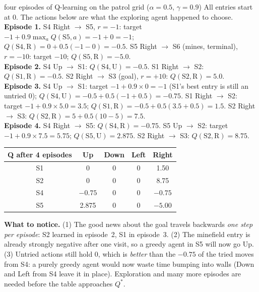 \documentclass[11pt]{article}
\begin{document}
\begin{example}{four episodes of Q-learning on the patrol grid ($\alpha=0.5$, $\gamma=0.9$)}
All entries start at 0. The actions below are what the exploring agent happened to choose.\\[2pt]
\textbf{Episode 1.} S4 Right $\to$ S5, $r=-1$: target $-1+0.9\max_aQ(\text{S5},a)=-1+0=-1$; $Q(\text{S4},\text{R})=0+0.5(-1-0)=-0.5$. S5 Right $\to$ S6 (mines, terminal), $r=-10$: target $-10$; $Q(\text{S5},\text{R})=-5.0$.\\
\textbf{Episode 2.} S4 Up $\to$ S1: $Q(\text{S4},\text{U})=-0.5$. S1 Right $\to$ S2: $Q(\text{S1},\text{R})=-0.5$. S2 Right $\to$ S3 (goal), $r=+10$: $Q(\text{S2},\text{R})=5.0$.\\
\textbf{Episode 3.} S4 Up $\to$ S1: target $-1+0.9\times0=-1$ (S1's best entry is still an untried 0); $Q(\text{S4},\text{U})=-0.5+0.5(-1+0.5)=-0.75$. S1 Right $\to$ S2: target $-1+0.9\times5.0=3.5$; $Q(\text{S1},\text{R})=-0.5+0.5(3.5+0.5)=\mathbf{1.5}$. S2 Right $\to$ S3: $Q(\text{S2},\text{R})=5+0.5(10-5)=7.5$.\\
\textbf{Episode 4.} S4 Right $\to$ S5: $Q(\text{S4},\text{R})=-0.75$. S5 Up $\to$ S2: target $-1+0.9\times7.5=5.75$; $Q(\text{S5},\text{U})=2.875$. S2 Right $\to$ S3: $Q(\text{S2},\text{R})=8.75$.
\begin{center}\small\renewcommand{\arraystretch}{1.2}\begin{tabular}{c|cccc}\toprule Q after 4 episodes & Up & Down & Left & Right\\\midrule
S1 & 0 & 0 & 0 & 1.50\\S2 & 0 & 0 & 0 & 8.75\\S4 & $-0.75$ & 0 & 0 & $-0.75$\\S5 & 2.875 & 0 & 0 & $-5.00$\\\bottomrule\end{tabular}\end{center}
\textbf{What to notice.} (1) The good news about the goal travels backwards \emph{one step per episode}: S2 learned in episode~2, S1 in episode~3. (2) The minefield entry is already strongly negative after one visit, so a greedy agent in S5 will now go Up. (3) Untried actions still hold 0, which is \emph{better} than the $-0.75$ of the tried moves from S4: a purely greedy agent would now waste time bumping into walls (Down and Left from S4 leave it in place). Exploration and many more episodes are needed before the table approaches $Q^*$.
\end{example}
\end{document}
